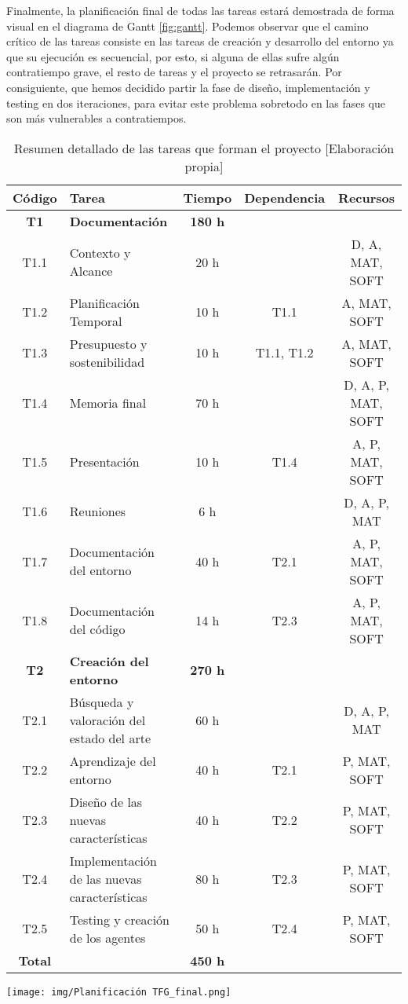 Finalmente, la planificación final de todas las tareas estará demostrada de forma visual en el diagrama de Gantt \ref{fig:gantt}. Podemos observar que el camino crítico de las tareas consiste en las tareas de creación y desarrollo del entorno ya que su ejecución es secuencial, por esto, si alguna de ellas sufre algún contratiempo grave, el resto de tareas y el proyecto se retrasarán. Por consiguiente, que hemos decidido partir la fase de diseño, implementación y testing en dos iteraciones, para evitar este problema sobretodo en las fases que son más vulnerables a contratiempos.

\begin{table}[t]
    \begin{center}
        \begin{tabular}{| c | l | c | c | c |}
        \hline
        \textbf{Código} & \textbf{Tarea} & \textbf{Tiempo} & \textbf{Dependencia} & \textbf{Recursos} \\ \hline
        \textbf{T1} & \textbf{Documentación} & \textbf{180 h} & & \\ \hline
        T1.1 & Contexto y Alcance & 20 h & & D, A, MAT, SOFT \\
        T1.2 & Planificación Temporal & 10 h & T1.1 & A, MAT, SOFT \\
        T1.3 & Presupuesto y sostenibilidad & 10 h & T1.1, T1.2 & A, MAT, SOFT \\
        T1.4 & Memoria final & 70 h &  & D, A, P, MAT, SOFT \\
        T1.5 & Presentación & 10 h & T1.4 & A, P, MAT, SOFT \\
        T1.6 & Reuniones & 6 h & & D, A, P, MAT \\ 
        T1.7 & Documentación del entorno & 40 h & T2.1 & A, P, MAT, SOFT \\ 
        T1.8 & Documentación del código & 14 h & T2.3 & A, P, MAT, SOFT \\ 
        \hline
        \textbf{T2} & \textbf{Creación del entorno} & \textbf{270 h} & &  \\ \hline
        T2.1 & Búsqueda y valoración del estado del arte & 60 h & & D, A, P, MAT \\
        T2.2 & Aprendizaje del entorno & 40 h & T2.1 & P, MAT, SOFT \\
        T2.3 & Diseño de las nuevas características & 40 h & T2.2 & P, MAT, SOFT \\
        T2.4 & Implementación de las nuevas características & 80 h & T2.3 & P, MAT, SOFT \\
        T2.5 & Testing y creación de los agentes & 50 h & T2.4 & P, MAT, SOFT \\
         \hline
         \textbf{Total} & & \textbf{450 h} & & \\
         \hline
        \end{tabular}
        \caption{Resumen detallado de las tareas que forman el proyecto [Elaboración propia]}
        \label{tab:planificacion}
    \end{center}
\end{table}

\begin{center}
    \texttt{[image: img/Planificación TFG\_final.png]}
     \label{fig:gantt}
\end{center}

